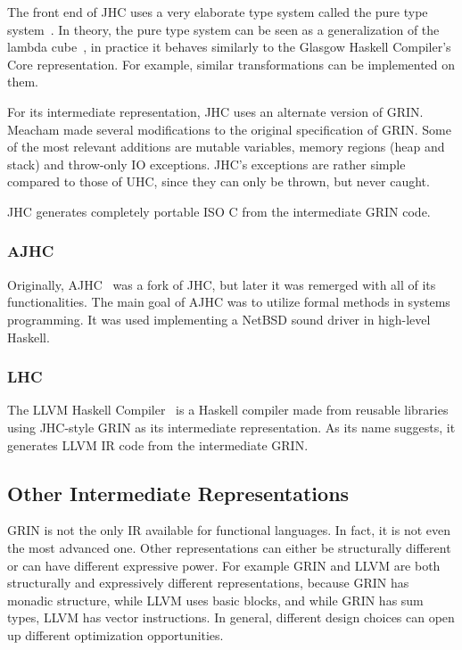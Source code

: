 \documentclass[main.tex]{subfiles}
\begin{document}
	The front end of JHC uses a very elaborate type system called the pure type system~\cite{pts-berardi, pts-terlouw}. In theory, the pure type system can be seen as a generalization of the lambda cube~\cite{lambda-cube}, in practice it behaves similarly to the Glasgow Haskell Compiler's Core representation. For example, similar transformations can be implemented on them.
	
	For its intermediate representation, JHC uses an alternate version of GRIN. Meacham made several modifications to the original specification of GRIN. Some of the most relevant additions are mutable variables, memory regions (heap and stack) and throw-only IO exceptions. JHC's exceptions are rather simple compared to those of UHC, since they can only be thrown, but never caught.
	
	JHC generates completely portable ISO C from the intermediate GRIN code.
	
	\subsubsection{AJHC}
	
	Originally, AJHC~\cite{ajhc} was a fork of JHC, but later it was remerged with all of its functionalities. The main goal of AJHC was to utilize formal methods in systems programming. It was used implementing a NetBSD sound driver in high-level Haskell.
	
	\subsubsection{LHC}
	
	The LLVM Haskell Compiler~\cite{lhc} is a Haskell compiler made from reusable libraries using JHC-style GRIN as its intermediate representation. As its name suggests, it generates LLVM IR code from the intermediate GRIN.
	
	\subsection{Other Intermediate Representations}
	
	GRIN is not the only IR available for functional languages. In fact, it is not even the most advanced one. Other representations can either be structurally different or can have different expressive power. For example GRIN and LLVM are both structurally and expressively different representations, because GRIN has monadic structure, while LLVM uses basic blocks, and while GRIN has sum types, LLVM has vector instructions. In general, different design choices can open up different optimization opportunities.
	
\end{document}
